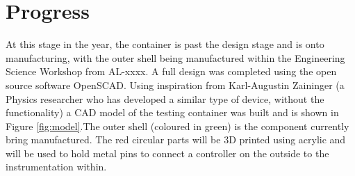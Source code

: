 \documentclass[a4paper,11pt]{article}
\begin{document}
\section{Progress}
At this stage in the year, the container is past the design stage and is onto manufacturing, with the outer shell being manufactured within the Engineering Science Workshop from AL-xxxx. A full design was completed using the open source software OpenSCAD. Using inspiration from Karl-Augustin Zaininger (a Physics researcher who has developed a similar type of device, without the functionality) a CAD model of the testing container was built and is shown in Figure \ref{fig:model}.The outer shell (coloured in green) is the component currently bring manufactured. The red circular parts will be 3D printed using acrylic and will be used to hold metal pins to connect a controller on the outside to the instrumentation within.  \\ 
\end{document}

